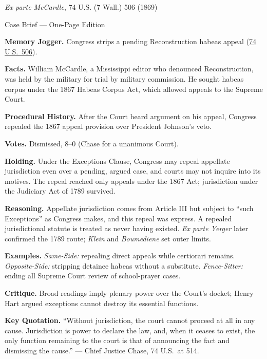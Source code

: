 \documentclass[12pt]{article}
\begin{document}
\begin{center}
{\Large \textit{Ex parte McCardle}, 74 U.S. (7 Wall.) 506 (1869)\par}
\vspace{0.3em}
{\normalsize Case Brief --- One-Page Edition\par}
\end{center}

\textbf{Memory Jogger.} Congress strips a pending Reconstruction habeas appeal (\href{https://supreme.justia.com/cases/federal/us/74/506/}{74 U.S.\ 506}).

\textbf{Facts.} William McCardle, a Mississippi editor who denounced Reconstruction, was held by the military for trial by military commission. He sought habeas corpus under the 1867 Habeas Corpus Act, which allowed appeals to the Supreme Court.

\textbf{Procedural History.} After the Court heard argument on his appeal, Congress repealed the 1867 appeal provision over President Johnson's veto.

\textbf{Votes.} Dismissed, 8--0 (Chase for a unanimous Court).

\textbf{Holding.} Under the Exceptions Clause, Congress may repeal appellate jurisdiction even over a pending, argued case, and courts may not inquire into its motives. The repeal reached only appeals under the 1867 Act; jurisdiction under the Judiciary Act of 1789 survived.

\textbf{Reasoning.} Appellate jurisdiction comes from Article III but subject to ``such Exceptions'' as Congress makes, and this repeal was express. A repealed jurisdictional statute is treated as never having existed. \textit{Ex parte Yerger} later confirmed the 1789 route; \textit{Klein} and \textit{Boumediene} set outer limits.

\textbf{Examples.} \emph{Same-Side:} repealing direct appeals while certiorari remains. \emph{Opposite-Side:} stripping detainee habeas without a substitute. \emph{Fence-Sitter:} ending all Supreme Court review of school-prayer cases.

\textbf{Critique.} Broad readings imply plenary power over the Court's docket; Henry Hart argued exceptions cannot destroy its essential functions.

\textbf{Key Quotation.} ``Without jurisdiction, the court cannot proceed at all in any cause. Jurisdiction is power to declare the law, and, when it ceases to exist, the only function remaining to the court is that of announcing the fact and dismissing the cause.'' --- Chief Justice Chase, 74 U.S.\ at 514.
\end{document}
